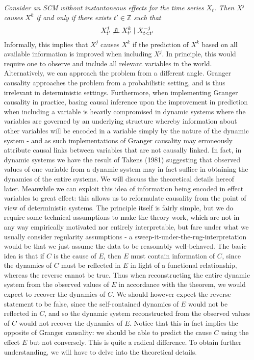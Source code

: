\documentclass[11pt, a4paper]{memoir}
\theoremstyle{plain}
\theoremstyle{definition}
\newcommand{\mZ}{\mathbb{Z}}
\newcommand{\indep}{\perp \!\!\! \perp}
\begin{document}
\textit{Consider an SCM without instantaneous effects for the time series $X_t$. Then $X^j$ causes $X^k$ if and only if there exists $t'\in \mZ$ such that
$$X_{t'}^j\centernot \indep X_{t'}^k\mid X_{t<t'}^{-j}$$}
Informally, this implies that $X^j$ causes $X^k$ if the prediction of $X^k$ based on all available information is improved when including $X^j$. In principle, this would require one to observe and include all relevant variables in the world.\\
Alternatively, we can approach the problem from a different angle. Granger causality approaches the problem from a probabilistic setting, and is thus irrelevant in deterministic settings. Furthermore, when implementing Granger causality in practice, basing causal inference upon the improvement in prediction when including a variable is heavily compromised in dynamic systems where the variables are governed by an underlying structure whereby information about other variables will be encoded in a variable simply by the nature of the dynamic system - and as such implementations of Granger causality may erroneously attribute causal links between variables that are not causally linked. In fact, in dynamic systems we have the result of Takens (1981) suggesting that observed values of one variable from a dynamic system may in fact suffice in obtaining the dynamics of the entire systems. We will discuss the theoretical details hereof later. Meanwhile we can exploit this idea of information being encoded in effect variables to great effect: this allows us to reformulate causality from the point of view of deterministic systems. The principle itself is fairly simple, but we do require some technical assumptions to make the theory work, which are not in any way empirically motivated nor entirely interpretable, but fare under what we usually consider regularity assumptions - a sweep-it-under-the-rug-interpretation would be that we just assume the data to be reasonably well-behaved. The basic idea is that if $C$ is the cause of $E$, then $E$ must contain information of $C$, since the dynamics of $C$ must be reflected in $E$ in light of a functional relationship, whereas the reverse cannot be true. Thus when reconstructing the entire dynamic system from the observed values of $E$ in accordance with the theorem, we would expect to recover the dynamics of $C$. We should however expect the reverse statement to be false, since the self-contained dynamics of $E$ would not be reflected in $C$, and so the dynamic system reconstructed from the observed values of $C$ would not recover the dynamics of $E$. Notice that this in fact implies the opposite of Granger causality: we should be able to predict the cause $C$ using the effect $E$ but not conversely. This is quite a radical difference. To obtain further understanding, we will have to delve into the theoretical details. 
\end{document}
